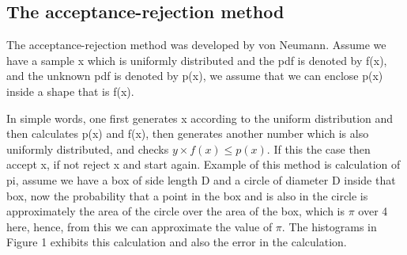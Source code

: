 \subsection{The acceptance-rejection method}
The acceptance-rejection method was developed by von Neumann.
Assume we have a sample x which is uniformly distributed and the pdf is denoted by f(x),
and the unknown pdf is denoted by p(x),
we assume that we can enclose p(x) inside a shape that is f(x).

In simple words, one first generates x according to the uniform distribution
and then calculates p(x) and f(x), then generates another number which is also uniformly distributed,
and checks  $y \times f(x) \leq p(x)$.
If this the case then accept x, if not reject x and start again.
Example of this method is calculation of pi, assume we have a box of side length D and a circle of diameter D inside that box, now the probability that a point in the box and is also in the circle is approximately the area of the circle over the area of the box, which is $\pi$ over 4 here, hence, from this we can approximate the value of $\pi$. The histograms in Figure 1 exhibits this calculation and also the error in the calculation\citep{Weinzierl}.



